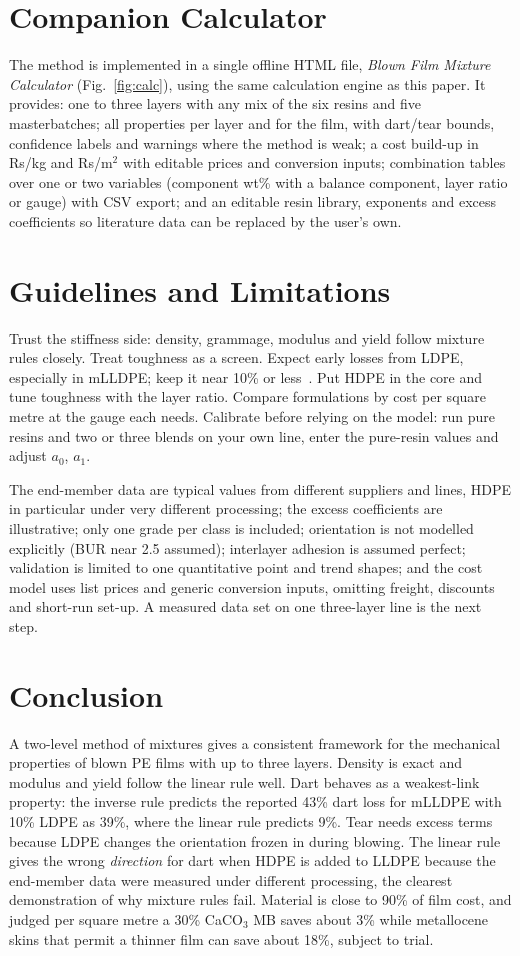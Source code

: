 \documentclass[conference,a4paper]{IEEEtran}
\begin{document}
\section{Companion Calculator}
The method is implemented in a single offline HTML file, \emph{Blown Film Mixture Calculator} (Fig.~\ref{fig:calc}), using the same calculation engine as this paper. It provides: one to three layers with any mix of the six resins and five masterbatches; all properties per layer and for the film, with dart/tear bounds, confidence labels and warnings where the method is weak; a cost build-up in Rs/kg and Rs/m$^2$ with editable prices and conversion inputs; combination tables over one or two variables (component wt\% with a balance component, layer ratio or gauge) with CSV export; and an editable resin library, exponents and excess coefficients so literature data can be replaced by the user's own.



\section{Guidelines and Limitations}
Trust the stiffness side: density, grammage, modulus and yield follow mixture rules closely. Treat toughness as a screen. Expect early losses from LDPE, especially in mLLDPE; keep it near 10\% or less~\cite{tas}. Put HDPE in the core and tune toughness with the layer ratio. Compare formulations by cost per square metre at the gauge each needs. Calibrate before relying on the model: run pure resins and two or three blends on your own line, enter the pure-resin values and adjust $a_0$, $a_1$.

The end-member data are typical values from different suppliers and lines, HDPE in particular under very different processing; the excess coefficients are illustrative; only one grade per class is included; orientation is not modelled explicitly (BUR near 2.5 assumed); interlayer adhesion is assumed perfect; validation is limited to one quantitative point and trend shapes; and the cost model uses list prices and generic conversion inputs, omitting freight, discounts and short-run set-up. A measured data set on one three-layer line is the next step.

\section{Conclusion}
A two-level method of mixtures gives a consistent framework for the mechanical properties of blown PE films with up to three layers. Density is exact and modulus and yield follow the linear rule well. Dart behaves as a weakest-link property: the inverse rule predicts the reported 43\% dart loss for mLLDPE with 10\% LDPE as 39\%, where the linear rule predicts 9\%. Tear needs excess terms because LDPE changes the orientation frozen in during blowing. The linear rule gives the wrong \emph{direction} for dart when HDPE is added to LLDPE because the end-member data were measured under different processing, the clearest demonstration of why mixture rules fail. Material is close to 90\% of film cost, and judged per square metre a 30\% CaCO$_3$ MB saves about 3\% while metallocene skins that permit a thinner film can save about 18\%, subject to trial.
\end{document}

